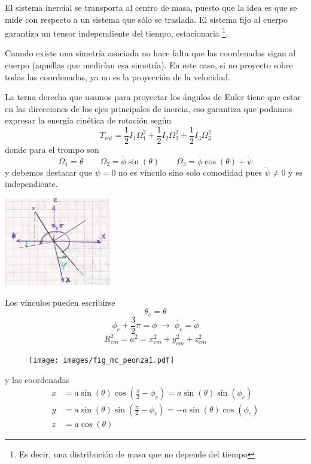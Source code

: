 \documentclass[10pt,oneside]{CBFT_book}
\begin{document}
El sistema inercial se transporta al centro de masa, puesto que la idea es que se mide con respecto a un
sistema que sólo se traslada.
El sistema fijo al cuerpo garantiza un tensor independiente del tiempo, estacionaria \footnote{Es decir, una
distribución de masa que no depende del tiempo}. 

Cuando existe una simetría asociada no hace falta que las coordenadas sigan al cuerpo (aquellas que medirían
esa simetría). En este caso, si no proyecto sobre todas las coordenadas, ya no es la proyección de la 
velocidad.

La terna derecha que usamos para proyectar los ángulos de Euler tiene que estar en las direcciones de los
ejes principales de inercia, eso garantiza que podamos expresar la energía cinética de rotación según 
\[
	T_{rot} = \frac{1}{2} I_1 \Omega^2_ 1 + \frac{1}{2} I_2 \Omega^2_2 + \frac{1}{2} I_3 \Omega^2_3 
\]
donde para el trompo son 
\[
	\Omega_1 = \dot{\theta} \qquad \Omega_2 = \dot{\phi} \sin(\theta) \qquad \Omega_3 = \dot{\phi} \cos(\theta) + \dot{\psi}
\]
y debemos destacar que $\psi=0$ no es vínculo sino solo comodidad pues $\dot{\psi} \neq 0$ y es independiente.

\includegraphics[width=0.35\textwidth]{images/fig_mc_peonza_segunda_2.jpg}

Los vínculos pueden escribirse
\[
	\theta_e = \theta
\]
\[
	\phi_e + \frac{3}{2}\pi = \phi \; \longrightarrow \; \dot{\phi_e} = \dot{\phi}
\]
\[
	R^2_{cm} = a^2 = x_{cm}^2 + y_{cm}^2 + z_{cm}^2
\]

\begin{figure}[htb]
	\begin{center}
	\texttt{[image: images/fig\_mc\_peonza1.pdf]}	 
	\end{center}
	\caption{}
\end{figure} 
y las coordenadas
\begin{align*}
	x &= a \sin(\theta) \cos\left( \frac{\pi}{2}-\phi_e \right) = a \sin(\theta) \sin( \phi_e ) \\
	y &= a \sin(\theta) \sin\left( \frac{\pi}{2}-\phi_e \right) = -a \sin(\theta) \cos( \phi_e ) \\
	z &= a \cos(\theta)
\end{align*}
\end{document}
